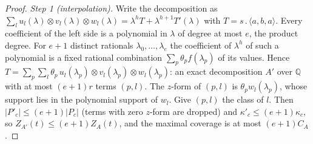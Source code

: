 \documentclass[11pt]{article}
\theoremstyle{definition}
\theoremstyle{remark}
\providecommand{\Q}{\mathbb{Q}}
\newcommand{\abs}[1]{\lvert #1\rvert}
\newcommand{\mat}[3]{\langle #1,#2,#3\rangle} %
\newcommand{\cp}{\mathbin{.}}                 %
\begin{document}
\begin{proof}
\emph{Step 1 (interpolation).} Write the decomposition as $\sum_lu_l(\lambda)\otimes v_l(\lambda)\otimes w_l(\lambda)=\lambda^hT+\lambda^{h+1}T'(\lambda)$ with $T=s\cp\mat aba$. Every coefficient of the left side is a polynomial in $\lambda$ of degree at most $e$, the product degree. For $e+1$ distinct rationals $\lambda_0,\dots,\lambda_e$ the coefficient of $\lambda^h$ of such a polynomial is a fixed rational combination $\sum_p\theta_pf(\lambda_p)$ of its values. Hence $T=\sum_p\sum_l\theta_p\,u_l(\lambda_p)\otimes v_l(\lambda_p)\otimes w_l(\lambda_p)$: an exact decomposition $A'$ over $\Q$ with at most $(e+1)r$ terms $(p,l)$. The $z$-form of $(p,l)$ is $\theta_pw_l(\lambda_p)$, whose support lies in the polynomial support of $w_l$. Give $(p,l)$ the class of $l$. Then $\abs{P'_c}\le(e+1)\abs{P_c}$ (terms with zero $z$-form are dropped) and $\kappa'_c\le(e+1)\kappa_c$, so $Z_{A'}(t)\le(e+1)Z_A(t)$, and the maximal coverage is at most $(e+1)C_A$.


\end{proof}
\end{document}
